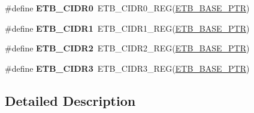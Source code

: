 \begin{DoxyCompactItemize}
\item 
\hypertarget{group___e_t_b___register___accessor___macros_gaab78adf7c1cb1b9c87b0195888994b25}{}\#define {\bfseries E\+T\+B\+\_\+\+C\+I\+D\+R0}~E\+T\+B\+\_\+\+C\+I\+D\+R0\+\_\+\+R\+E\+G(\hyperlink{group___e_t_b___peripheral_gaaefe9b614cb5542a69cb7461307f1267}{E\+T\+B\+\_\+\+B\+A\+S\+E\+\_\+\+P\+T\+R})\label{group___e_t_b___register___accessor___macros_gaab78adf7c1cb1b9c87b0195888994b25}

\item 
\hypertarget{group___e_t_b___register___accessor___macros_gaa2ed5cbc4614acbceaebe3743d8d1342}{}\#define {\bfseries E\+T\+B\+\_\+\+C\+I\+D\+R1}~E\+T\+B\+\_\+\+C\+I\+D\+R1\+\_\+\+R\+E\+G(\hyperlink{group___e_t_b___peripheral_gaaefe9b614cb5542a69cb7461307f1267}{E\+T\+B\+\_\+\+B\+A\+S\+E\+\_\+\+P\+T\+R})\label{group___e_t_b___register___accessor___macros_gaa2ed5cbc4614acbceaebe3743d8d1342}

\item 
\hypertarget{group___e_t_b___register___accessor___macros_ga0a1991abf64d588fb262f8e3f349a650}{}\#define {\bfseries E\+T\+B\+\_\+\+C\+I\+D\+R2}~E\+T\+B\+\_\+\+C\+I\+D\+R2\+\_\+\+R\+E\+G(\hyperlink{group___e_t_b___peripheral_gaaefe9b614cb5542a69cb7461307f1267}{E\+T\+B\+\_\+\+B\+A\+S\+E\+\_\+\+P\+T\+R})\label{group___e_t_b___register___accessor___macros_ga0a1991abf64d588fb262f8e3f349a650}

\item 
\hypertarget{group___e_t_b___register___accessor___macros_gadaa5e743c6083fc4249bd1777313895f}{}\#define {\bfseries E\+T\+B\+\_\+\+C\+I\+D\+R3}~E\+T\+B\+\_\+\+C\+I\+D\+R3\+\_\+\+R\+E\+G(\hyperlink{group___e_t_b___peripheral_gaaefe9b614cb5542a69cb7461307f1267}{E\+T\+B\+\_\+\+B\+A\+S\+E\+\_\+\+P\+T\+R})\label{group___e_t_b___register___accessor___macros_gadaa5e743c6083fc4249bd1777313895f}

\end{DoxyCompactItemize}


\subsection{Detailed Description}

